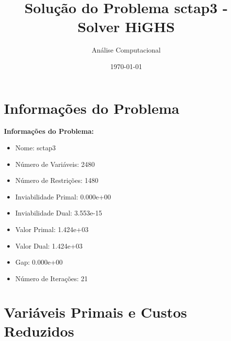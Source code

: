 \documentclass[12pt]{article}
\title{Solução do Problema sctap3 - Solver HiGHS}
\author{Análise Computacional}
\date{\today}
\begin{document}
\maketitle

\section{Informações do Problema}

\textbf{Informações do Problema:}
\begin{itemize}
\item Nome: sctap3
\item Número de Variáveis: 2480
\item Número de Restrições: 1480
\item Inviabilidade Primal: 0.000e+00
\item Inviabilidade Dual: 3.553e-15
\item Valor Primal: 1.424e+03
\item Valor Dual: 1.424e+03
\item Gap: 0.000e+00
\item Número de Iterações: 21
\end{itemize}


\section{Variáveis Primais e Custos Reduzidos}
\end{document}
